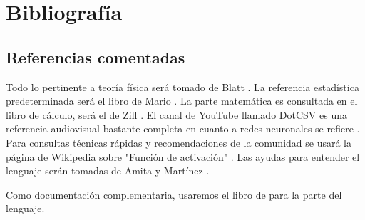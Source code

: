 \documentclass[titlepage,11pt]{article}
\begin{document}

\section{Bibliografía}
\label{sec:biografia}

\subsection*{Referencias comentadas}
\label{sec:referencias}

Todo lo pertinente a teoría física será tomado de Blatt \cite{Fisica}. La referencia estadística predeterminada será el libro de Mario \cite{triola_2018_estadstica}. La parte matemática es consultada en el libro de cálculo, será el de Zill \cite{zill_1985_clculo}. El canal de YouTube llamado DotCSV es una referencia audiovisual bastante completa en cuanto a redes neuronales se refiere \cite{santana_2018_1,santana_2018_2,santana_2018_3,santana_2018_3_5}. Para consultas técnicas rápidas y recomendaciones de la comunidad se usará la página de Wikipedia sobre "Función de activación" \cite{wikipediacontributors_2018_activation}. Las ayudas para entender el lenguaje serán tomadas de Amita y Martínez \cite{Amita}. 

Como documentación complementaria, usaremos el libro de \cite{Jesus} para la parte del lenguaje.



\end{document}
